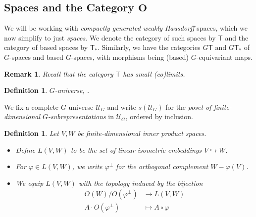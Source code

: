 \documentclass{scrartcl}
\newtheorem{defin}[subsection]{Definition}
\newtheorem{rem}[subsection]{Remark}
\begin{document}
\subsection*{Spaces and the Category $\mathbf{O}$}

We will be working with \textit{compactly generated weakly Hausdorff} spaces, which we now simplify to just \textit{spaces}. We denote the category of such spaces by $\mathsf{T}$ and the category of based spaces by $\mathsf{T}_*$. Similarly, we have the categories $G\mathsf{T}$ and $G\mathsf{T}_*$ of $G$-spaces and based $G$-spaces, with morphisms being (based) $G$-equivariant maps.
\begin{rem}
    Recall that the category $\mathsf{T}$ has small (co)limits.
\end{rem} 

\begin{defin}
    $G$-universe, \cite[def. 1.1.12]{GHT}.
\end{defin}

We fix a complete $G$-universe $\mathcal{U}_G$ and write $s(\mathcal{U}_G)$ for the \textit{poset of finite-dimensional $G$-subrepresentations} in $\mathcal{U}_G$, ordered by inclusion. 

\begin{defin} 
    Let $V,W$ be finite-dimensional inner product spaces. 
    \begin{itemize}
        \item Define $L(V,W)$ to be the set of linear isometric embeddings $V\hookrightarrow W$. 
        \item For $\varphi\in L(V,W)$, we write $\varphi^\perp$ for the orthogonal complement $W- \varphi(V)$.
        \item We equip $L(V,W)$ with the topology induced by the bijection 
              \begin{align*}
                  O(W)/O(\varphi^\bot) &\to L(V,W) \\
                  A\cdot O(\varphi^\bot) &\mapsto A\circ \varphi
              \end{align*} 
    \end{itemize} 
\end{defin} 
\end{document}
